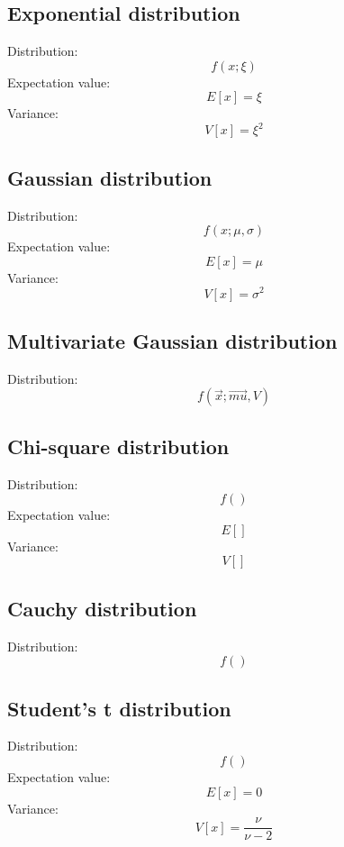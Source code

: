 \documentclass[12pt]{book}
\newcommand{\vx}{\vec{x}}
\begin{document}
\subsection{Exponential distribution}
Distribution:
\begin{equation}
	f(x;\xi)
\end{equation}
Expectation value:
\begin{equation}
	E[x] = \xi
\end{equation}
Variance:
\begin{equation}
	V[x] = \xi^2
\end{equation}
\subsection{Gaussian distribution}
Distribution:
\begin{equation}
	f(x;\mu,\sigma)
\end{equation}
Expectation value:
\begin{equation}
	E[x] = \mu
\end{equation}
Variance:
\begin{equation}
	V[x] = \sigma^2
\end{equation}
\subsection{Multivariate Gaussian distribution}
Distribution:
\begin{equation}
	f(\vx;\vec{mu},V)
\end{equation}
\subsection{Chi-square distribution}
Distribution:
\begin{equation}
	f()
\end{equation}
Expectation value:
\begin{equation}
	E[]
\end{equation}
Variance:
\begin{equation}
	V[]
\end{equation}
\subsection{Cauchy distribution}
Distribution:
\begin{equation}
	f()
\end{equation}
\subsection{Student's t distribution}
Distribution:
\begin{equation}
	f()
\end{equation}
Expectation value:
\begin{equation}
	E[x] = 0
\end{equation}
Variance:
\begin{equation}
	V[x] = \frac{\nu}{\nu-2}
\end{equation}
\end{document}
